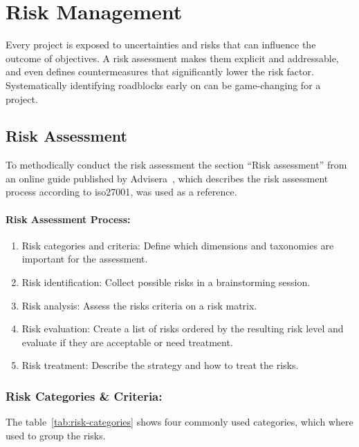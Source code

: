 \newpage
\section{Risk Management}\label{sec:risk-management}

Every project is exposed to uncertainties and risks that can influence the outcome of objectives.
A risk assessment makes them explicit and addressable, and even defines countermeasures that significantly lower the risk factor.
Systematically identifying roadblocks early on can be game-changing for a project.

\subsection{Risk Assessment}\label{subsec:risk_assessment}

To methodically conduct the risk assessment the section \enquote{Risk assessment} from an online guide published by Advisera~\cite{advisera_iso27001_risk_assessment},
which describes the risk assessment process according to \gls{iso27001}, was used as a reference.

\paragraph{Risk Assessment Process:}
\begin{enumerate}
    \item Risk categories and criteria: Define which dimensions and taxonomies are important for the assessment.
    \item Risk identification: Collect possible risks in a brainstorming session.
    \item Risk analysis: Assess the risks criteria on a risk matrix.
    \item Risk evaluation: Create a list of risks ordered by the resulting risk level and evaluate if they are acceptable or need treatment.
    \item Risk treatment: Describe the strategy and how to treat the risks.
\end{enumerate}

\subsubsection{Risk Categories \& Criteria:}\label{subsubsec:risk-categories-and-criteria}

The table~\ref{tab:risk-categories} shows four commonly used categories, which where used to group the risks.

